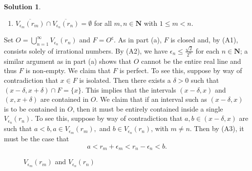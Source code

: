 \documentclass[12pt]{article}
\theoremstyle{definition}
\theoremstyle{exercise}
\theoremstyle{solution}
\newtheorem*{solution}{Solution}
\newcommand{\setcomp}[1]{#1^{\mathsf{c}}}
\newcommand{\N}{\mathbf{N}}
\begin{document}
\begin{solution}
\begin{enumerate}
\begin{enumerate}[itemsep=8pt, leftmargin=44pt, label=(A\arabic*)]
            \item \( \overline{V_{\epsilon_m}(r_m)} \cap \overline{V_{\epsilon_n}(r_n)} = \emptyset \) for all \( m, n \in \N \) with \( 1 \leq m < n \).
        \end{enumerate}
        Set \( O = \bigcup_{n=1}^{\infty} V_{\epsilon_n}(r_n) \) and \( F = \setcomp{O} \). As in part (a), \( F \) is closed and, by (A1), consists solely of irrational numbers. By (A2), we have \( \epsilon_n \leq \tfrac{\sqrt{2}}{2^n} \) for each \( n \in \N \); a similar argument as in part (a) shows that \( O \) cannot be the entire real line and thus \( F \) is non-empty. We claim that \( F \) is perfect. To see this, suppose by way of contradiction that \( x \in F \) is isolated. Then there exists a \( \delta > 0 \) such that \( (x - \delta, x + \delta) \cap F = \{ x \} \). This implies that the intervals \( (x - \delta, x) \) and \( (x, x + \delta) \) are contained in \( O \). We claim that if an interval such as \( (x - \delta, x) \) is to be contained in \( O \), then it must be entirely contained inside a single \( V_{\epsilon_n}(r_n) \). To see this, suppose by way of contradiction that \( a, b \in (x - \delta, x) \) are such that \( a < b, a \in V_{\epsilon_m}(r_m), \) and \( b \in V_{\epsilon_n}(r_n) \), with \( m \neq n \). Then by (A3), it must be the case that
        \[
            a < r_m + \epsilon_m < r_n - \epsilon_n < b.
        \]
        \begin{figure}[h]
            \centering
            \caption{\( V_{\epsilon_m}(r_m) \) and \( V_{\epsilon_n}(r_n) \)} \label{fig:2}
        \end{figure}
        

\end{enumerate}
\end{solution}
\end{document}
